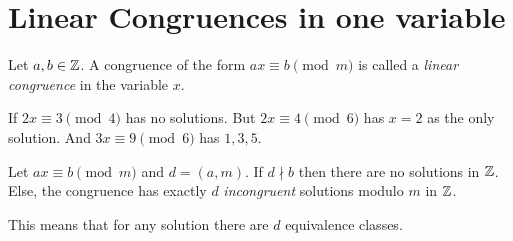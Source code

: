 \section{Linear Congruences in one variable}%

\begin{definition}
    Let $a, b \in \mathbb{Z}$. A congruence of the form  $ax \equiv b \pmod m$ is called a \emph{linear congruence} in the variable  $x$.
\end{definition}

\begin{eg}
    If $2x \equiv 3 \pmod 4$  has no solutions. But  $2x \equiv 4 \pmod 6$ has  $x = 2$ as the only solution. And $3x \equiv 9 \pmod 6$ has  $1,3,5$.
\end{eg}

\begin{theorem}
    Let $ax \equiv b \pmod m$ and $d = (a, m)$. If  $d \nmid b$ then there are no solutions in $\mathbb{Z}$. Else, the congruence has exactly  $d$ \emph{incongruent} solutions modulo $m$ in  $\mathbb{Z}$.
\end{theorem}
\begin{note}
    This means that for any solution there are $d$ equivalence classes.
\end{note}
